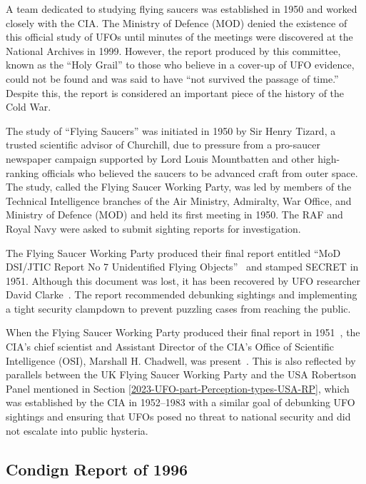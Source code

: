 A team dedicated to studying flying saucers was established in 1950 and worked closely with the CIA. The Ministry of Defence (MOD) denied the existence of this official study of UFOs until minutes of the meetings were discovered at the National Archives in 1999. However, the report produced by this committee, known as the ``Holy Grail'' to those who believe in a cover-up of UFO evidence, could not be found and was said to have ``not survived the passage of time.'' Despite this, the report is considered an important piece of the history of the Cold War.

The study of ``Flying Saucers'' was initiated in 1950 by Sir Henry Tizard, a trusted scientific advisor of Churchill, due to pressure from a pro-saucer newspaper campaign supported by Lord Louis Mountbatten and other high-ranking officials who believed the saucers to be advanced craft from outer space. The study, called the Flying Saucer Working Party, was led by members of the Technical Intelligence branches of the Air Ministry, Admiralty, War Office, and Ministry of Defence (MOD) and held its first meeting in 1950. The RAF and Royal Navy were asked to submit sighting reports for investigation.

The Flying Saucer Working Party produced their final report entitled ``MoD DSI/JTIC Report No 7 Unidentified Flying Objects''~\cite{FSWP1951} and stamped SECRET in 1951. Although this document was lost, it has been recovered by UFO researcher David Clarke~\cite{ClarkeFSWP}. The report recommended debunking sightings and implementing a tight security clampdown to prevent puzzling cases from reaching the public.

When the Flying Saucer Working Party produced their final report in 1951~\cite{FSWP1951},
the CIA's chief scientist
and Assistant Director of the CIA's Office of Scientific Intelligence (OSI), Marshall H. Chadwell, was present~\cite{Haines-CIA-UFO}. This is also reflected by parallels between the UK Flying Saucer Working Party and the USA Robertson Panel mentioned in Section \ref{2023-UFO-part-Perception-types-USA-RP}, which was established by the CIA in 1952--1983 with a similar goal of debunking UFO sightings and ensuring that UFOs posed no threat to national security and did not escalate into public hysteria.

\subsection{Condign Report of 1996}
\label{2023-UFO-part-Perception-types-UK-cr1996}


